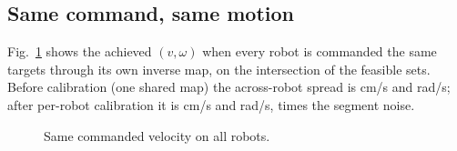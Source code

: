 \subsection{Same command, same motion}\label{sec:hw-same}

Fig.~\ref{fig:same} shows the achieved \((v,\omega)\) when every robot
is commanded the same targets through its own inverse map, on the
intersection of the feasible sets. Before calibration (one shared map)
the across-robot spread is  cm/s and  rad/s; after
per-robot calibration it is  cm/s and  rad/s,  times
the segment noise. 

\begin{figure}[t]
\centering
{}
\caption{Same commanded velocity on all robots. }
\label{fig:same}
\end{figure}
